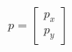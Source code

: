 \documentclass[preview]{standalone}
\begin{document}
\begin{center}
$p=\begin{bmatrix}p_x\\p_y\end{bmatrix}$
\end{center}
\end{document}
